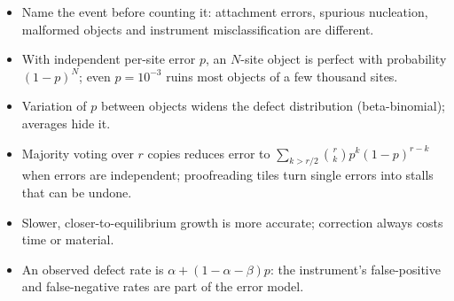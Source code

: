 \begin{KeyIdeas}
\begin{itemize}\setlength{\itemsep}{2pt}
\item Name the event before counting it: attachment errors, spurious
nucleation, malformed objects and instrument misclassification are different.
\item With independent per-site error $p$, an $N$-site object is perfect with
probability $(1-p)^N$; even $p=10^{-3}$ ruins most objects of a few thousand
sites.
\item Variation of $p$ between objects widens the defect distribution
(beta-binomial); averages hide it.
\item Majority voting over $r$ copies reduces error to
$\sum_{k>r/2}\binom rk p^k(1-p)^{r-k}$ when errors are independent; proofreading
tiles turn single errors into stalls that can be undone.
\item Slower, closer-to-equilibrium growth is more accurate; correction always
costs time or material.
\item An observed defect rate is $\alpha+(1-\alpha-\beta)p$: the instrument's
false-positive and false-negative rates are part of the error model.
\end{itemize}
\end{KeyIdeas}

